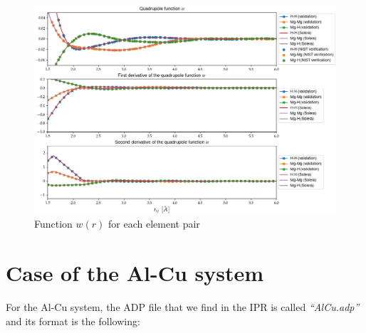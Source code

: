 \documentclass{article}
\begin{document}
\begin{figure}[h!]
	\centering
	\includegraphics[width=\textwidth]{Figures/Fig-Quadrupole-Function.png}
	\caption{Function $w(r)$ for each element pair}
\end{figure}

 
\vspace{30cm}

\text{                           }

\newpage


\section{Case of the Al-Cu system}

For the Al-Cu system, the ADP file that we find in the IPR is called \textit{``AlCu.adp''} and its format is the following:
\end{document}

